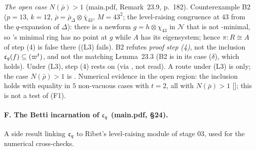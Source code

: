 \begin{outline}
\emph{The open case $N(\bar\rho)>1$} (main.pdf, Remark~23.9, p.~182). Counterexample B2 ($p=13$, $k=12$, $\bar\rho=\bar\rho_\Delta\otimes\bar\chi_{43}$,
$M=43^2$; the level-raising congruence at $43$ \stcomp{} from the $q$-expansion of $\Delta$): there is a newform $g=h\otimes\chi_{43}$ in
$\mathcal N$ that is not \cite{KO}-minimal, so \cite{KO}'s minimal ring has no point at $g$ while $A$ has its eigensystem; hence
$\pi:R\cong A$ of step (4) is false there ((L3) fails). B2 refutes \emph{proof step (4)}, not the inclusion $\mathfrak{c}_q(f)\subseteq(\varpi^t)$, and
not the matching Lemma~23.3 (B2 is in its case ($\delta$), which holds). Under (L3), step (4) rests on \cite[Lemma~2.4]{KO} (via
\cite{Dim09}, not read). A route under (L3) is \stsketch{} only; the case $N(\bar\rho)>1$ is \stopen. Numerical evidence in the open
region: the inclusion holds with equality in $5$ non-vacuous cases with $t=2$, all with $N(\bar\rho)>1$ \stcomp{}
[]; this is not a test of (F1).
\end{outline}

\paragraph{F. The Betti incarnation of $\mathfrak{c}_q$ (main.pdf, \S24).} A side result linking $\mathfrak{c}_q$ to Ribet's level-raising module of
stage 03, used for the numerical cross-checks.

